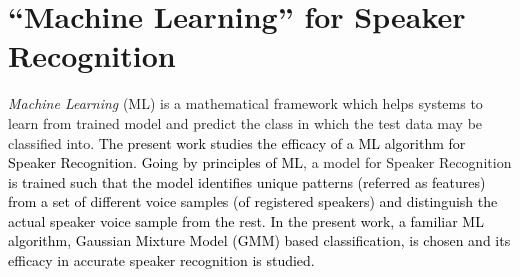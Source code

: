 \documentclass{article}
\begin{document}
\section{\textbf{{``Machine Learning'' for Speaker Recognition}}}
 \textit{Machine Learning} (ML) is a mathematical framework which helps systems to learn from trained model and predict the class in which the test data may be classified into. \textcolor{black}{The present work studies the efficacy of a ML algorithm for Speaker Recognition. Going by principles of ML}, a model for Speaker Recognition \textcolor{black}{is trained such that the model identifies unique patterns (referred as features) from a set of different voice samples (of registered speakers) and distinguish the actual speaker voice sample from the rest. In the present work, a familiar ML algorithm, Gaussian Mixture Model (GMM) based classification, is chosen and its efficacy in accurate speaker recognition is studied.}
\end{document}
